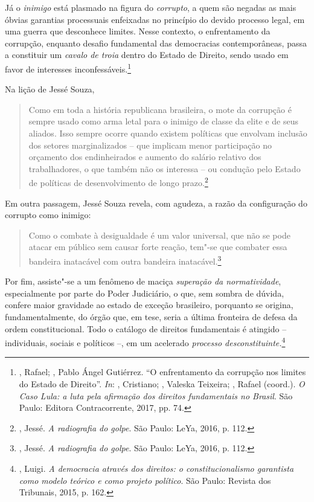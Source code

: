 Já o \emph{inimigo} está plasmado na figura do \emph{corrupto}, a quem
são negadas as mais óbvias garantias processuais enfeixadas no princípio
do devido processo legal, em uma guerra que desconhece limites. Nesse
contexto, o enfrentamento da corrupção, enquanto desafio fundamental das
democracias contemporâneas, passa a constituir um \emph{cavalo de troia}
dentro do Estado de Direito, sendo usado em favor de interesses
inconfessáveis.\footnote{, Rafael; , Pablo Ángel
  Gutiérrez. ``O enfrentamento da corrupção nos limites do Estado de
  Direito''. \emph{In}:  , Cristiano;  , Valeska
  Teixeira; , Rafael (coord.). \emph{O Caso Lula: a luta pela
  afirmação dos direitos fundamentais no Brasil}. São Paulo: Editora
  Contracorrente, 2017, pp. 74.}

Na lição de Jessé Souza,

\begin{quote}
Como em toda a história republicana brasileira, o mote da corrupção é
sempre usado como arma letal para o inimigo de classe da elite e de seus
aliados. Isso sempre ocorre quando existem políticas que envolvam
inclusão dos setores marginalizados -- que implicam menor participação
no orçamento dos endinheirados e aumento do salário relativo dos
trabalhadores, o que também não os interessa -- ou condução pelo Estado
de políticas de desenvolvimento de longo prazo.\footnote{, Jessé.
  \emph{A radiografia do golpe}. São Paulo: LeYa, 2016, p. 112.}
\end{quote}

Em outra passagem, Jessé Souza revela, com agudeza, a razão da
configuração do corrupto como inimigo:

\begin{quote}
Como o combate à desigualdade é
um valor universal, que não se pode atacar em público sem causar forte
reação, tem"-se que combater essa bandeira inatacável com outra bandeira
inatacável.\footnote{, Jessé. \emph{A radiografia do golpe}. São
  Paulo: LeYa, 2016, p. 112.}
\end{quote}

Por fim, assiste"-se a um fenômeno de maciça \emph{superação da
normatividade}, especialmente por parte do Poder Judiciário, o que, sem
sombra de dúvida, confere maior gravidade ao estado de exceção
brasileiro, porquanto se origina, fundamentalmente, do órgão que, em
tese, seria a última fronteira de defesa da ordem constitucional. Todo o
catálogo de direitos fundamentais é atingido -- individuais, sociais e
políticos --, em um acelerado \emph{processo desconstituinte.}\footnote{,
  Luigi. \emph{A democracia através dos direitos: o constitucionalismo
  garantista como modelo teórico e como projeto político}. São Paulo:
  Revista dos Tribunais, 2015, p. 162.}

